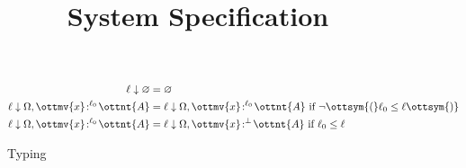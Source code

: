 \documentclass{article}
\title{System Specification}
\begin{document}

\begin{figure}
  \centering
{}

  \begin{equation*}
    \begin{split}
       \ell  \downarrow  \varnothing  &=  \varnothing  \\
        \ell  \downarrow  \Omega  ,   \ottmv{x} \! :^{ \ell_{{\mathrm{0}}} }\! \ottnt{A}   &=   \ell  \downarrow  \Omega  ,   \ottmv{x} \! :^{ \ell_{{\mathrm{0}}} }\! \ottnt{A}   \text{ if }  \neg  \ottsym{(}  \ell_{{\mathrm{0}}}  \leq  \ell  \ottsym{)}  \\
        \ell  \downarrow  \Omega  ,   \ottmv{x} \! :^{ \ell_{{\mathrm{0}}} }\! \ottnt{A}   &=   \ell  \downarrow  \Omega  ,   \ottmv{x} \! :^{  { \color{black}{\bot} }  }\! \ottnt{A}   \text{ if } \ell_{{\mathrm{0}}}  \leq  \ell
    \end{split}
  \end{equation*}
  \caption{Typing}
  \label{fig:typing}
\end{figure}
\end{document}
